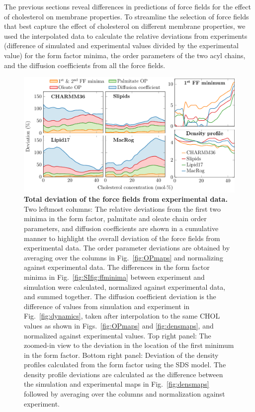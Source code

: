 \documentclass[journal=jctcce]{achemso}
\begin{document}
The previous sections reveal differences in predictions of 
force fields for the effect of cholesterol on membrane properties. 
To streamline the selection of force fields that best capture the effect of cholesterol on different membrane properties, we used the interpolated data to calculate the relative deviations from experiments (difference of simulated and experimental values divided by the experimental value) for the form factor minima, the order parameters of the two acyl chains, and the diffusion coefficients from all the force fields. 


\begin{figure}[htb!]
  \centering
  \includegraphics[width=\linewidth]{../FIGS/deviation.pdf}
  \caption{\label{fig:deviation}%
  \textbf{Total deviation of the force fields from experimental data.} 
%
  Two leftmost columns:
  The relative deviations from the first two minima in the form factor, palmitate and oleate chain order parameters, and diffusion coefficients are shown in a cumulative manner to highlight the overall deviation of the force fields from experimental data.
  The order parameter deviations are obtained by averaging over the columns in Fig.~\ref{fig:OPmaps} and normalizing against experimental data. The differences in the form factor minima in Fig.~\ref{fig:SIfig:ffminima} between experiment and simulation were calculated, normalized against experimental data, and summed together. The diffusion coefficient deviation is the difference of values from simulation and experiment in Fig.~\ref{fig:dynamics}, taken after interpolation to the same CHOL values as shown in Figs.~\ref{fig:OPmaps} and \ref{fig:densmaps}, and normalized against experimental values.
%
  Top right panel: 
  The zoomed-in view to the deviation in the location of the first minimum in the form factor.
%
  Bottom right panel:
  Deviation of the density profiles calculated from the form factor using the SDS model. The density profile deviations are calculated as the difference between the simulation and experimental maps in Fig.~\ref{fig:densmaps} followed by averaging over the columns and normalization against experiment.
  }
\end{figure}
\end{document}
